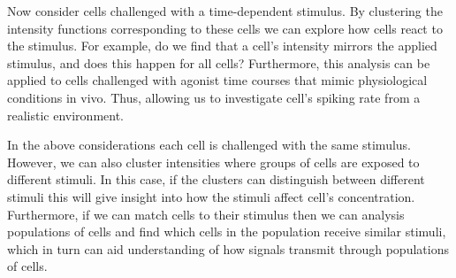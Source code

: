 \documentclass[12pt]{book} %
\begin{document}
 Now consider cells challenged with a time-dependent stimulus. By clustering the intensity functions corresponding to these cells we can explore how cells react to the stimulus. For example, do we find that a cell's intensity mirrors the applied stimulus, and does this happen for all cells? Furthermore, this analysis can be applied to cells challenged with agonist time courses that mimic physiological conditions in vivo. Thus, allowing us to investigate cell's spiking rate from a realistic environment.  

 
 In the above considerations  each cell is challenged with the same stimulus. However, we can also cluster intensities where groups of cells are exposed to different stimuli. In this case, if the clusters can distinguish between different stimuli this will give insight into how the stimuli affect cell's  concentration. Furthermore, if we can match cells to their stimulus then we can analysis populations of cells and find which cells in the population receive similar stimuli, which in turn can aid understanding of how signals transmit through populations of cells.
\end{document}
